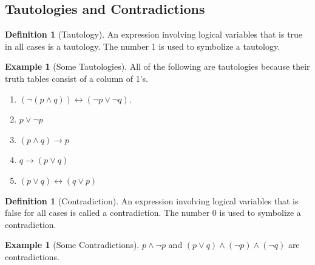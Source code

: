 \documentclass[10pt,]{book}
\theoremstyle{plain}
\theoremstyle{definition}
\newtheorem{definition}[theorem]{Definition}
\theoremstyle{definition}
\theoremstyle{definition}
\newtheorem{example}[theorem]{Example}
\theoremstyle{definition}
\begin{document}
\subsection[Tautologies and Contradictions]{Tautologies and Contradictions}\label{tautology-contradiction}
\begin{definition}[Tautology]\label{def-tautology}
\label{notation-6}
 An expression involving logical variables that is true in all cases is a tautology.  The number 1 is used to symbolize a tautology.%
\end{definition}
\begin{example}[Some Tautologies]\label{some-tautologies}
All of the following are tautologies because their truth tables consist of a column of 1's.%
\par
\leavevmode%
\begin{enumerate}[label=\alph*]
\item\hypertarget{li-78}{}\((\neg (p \land q))\leftrightarrow ( \neg  p \lor  \neg  q)\).%
\item\hypertarget{li-79}{}  \(p \lor \neg p\)%
\item\hypertarget{li-80}{}\((p \land q)\to  p\)%
\item\hypertarget{li-81}{}\(q\to (p\lor q)\)%
\item\hypertarget{li-82}{}\((p \lor  q)\leftrightarrow (q \lor p)\)%
\end{enumerate}
%
\end{example}
\begin{definition}[Contradiction]\label{def-contradiction}
\label{notation-7}
An expression involving logical variables that is false for all cases is called a contradiction. The number 0 is used to symbolize a contradiction.
%
\end{definition}
\begin{example}[Some Contradictions]\label{some-contradictions}
 \(p \land  \neg p\) and \((p\lor q)\land  (\neg p) \land  (\neg q)\) are contradictions.%
\end{example}
\typeout{************************************************}
\typeout{************************************************}
\end{document}
